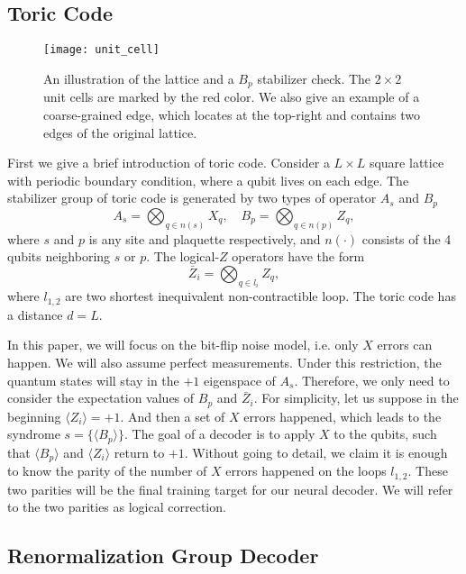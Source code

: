 \subsection{Toric Code}

\begin{figure}
	\texttt{[image: unit\_cell]}
	\caption{An illustration of the lattice and a $B_p$ stabilizer check. The $2\times 2$ unit cells are marked by the red color. We also give an example of a coarse-grained edge, which locates at the top-right and contains two edges of the original lattice.}
	\label{fig:lattice}
\end{figure}

First we give a brief introduction of toric code.
Consider a $L\times L$ square lattice with periodic boundary condition, where a qubit lives on each edge.
The stabilizer group of toric code is generated by two types of operator $A_s$ and $B_p$
\begin{equation}
A_s = \bigotimes_{q\in n(s)} X_q, \quad B_p = \bigotimes_{q\in n(p)} Z_q,
\end{equation}
where $s$ and $p$ is any site and plaquette respectively, and $n(\cdot)$ consists of the 4 qubits neighboring $s$ or $p$.
The logical-$Z$ operators have the form
\begin{equation}
\bar{Z}_i = \bigotimes_{q\in l_i} Z_q ,
\end{equation}
where $l_{1,2}$ are two shortest inequivalent non-contractible loop.
The toric code has a distance $d=L$.

In this paper, we will focus on the bit-flip noise model, i.e. only $X$ errors can happen.
We will also assume perfect measurements.
Under this restriction, the quantum states will stay in the $+1$ eigenspace of $A_s$.
Therefore, we only need to consider the expectation values of $B_p$ and $\bar{Z}_i$.
For simplicity, let us suppose in the beginning $\langle Z_i \rangle = +1$.
And then a set of $X$ errors happened, which leads to the syndrome $s=\{\langle B_p \rangle \}$.
The goal of a decoder is to apply $X$ to the qubits, such that $\langle B_p \rangle$ and $\langle Z_i \rangle$ return to $+1$.
Without going to detail, we claim it is enough to know the parity of the number of $X$ errors happened on the loops $l_{1,2}$.
These two parities will be the final training target for our neural decoder.
We will refer to the two parities as logical correction.

\subsection{Renormalization Group Decoder}

